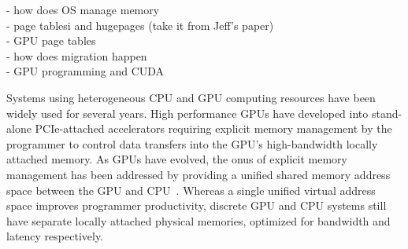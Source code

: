 {\color{red} 
- how does OS manage memory\\
- page tablesi and hugepages (take it from Jeff's paper)\\
- GPU page tables\\
- how does migration happen\\
- GPU programming and CUDA\\
}

Systems using heterogeneous CPU and GPU computing resources have been widely
used for several years.
High performance GPUs have developed into stand-alone PCIe-attached
accelerators requiring explicit memory management by the programmer to control
data transfers into the GPU's high-bandwidth locally attached memory. As GPUs
have evolved, the onus of explicit memory management has been addressed by
providing a unified shared memory address space between the GPU and
CPU~\cite{UVM,HSA}.  Whereas a single unified virtual address space improves
programmer productivity, discrete GPU and CPU systems still have separate
locally attached physical memories, optimized for bandwidth and latency
respectively. 


